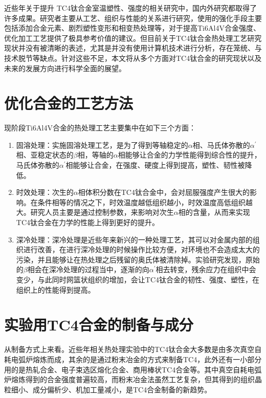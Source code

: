 \documentclass[
class = book,
zihao = -4,
font = noto,
paper = a4paper,
openany
]{easybook}
\newcommand{\ti}{Ti6Al4V}
\begin{document}
近些年关于提升 TC4钛合金室温塑性、强度的相关研究中，国内外研究都取得了许多成果\cite{guokaiTC4taihejinrechuligongyideyanjiuxianzhuangjijinzhan2021}。研究者主要从工艺、组织与性能的关系进行研究，使用的强化手段主要包括添加合金元素、剧烈塑性变形和相变热处理等，对于提高\ti 合金强度、优化加工工艺提供了极具参考价值的建议。但目前关于TC4钛合金热处理工艺研究现状并没有被清晰的表述，尤其是并没有使用计算机技术进行分析，存在笼统、与技术脱节等缺点。针对这些不足，本文将从多个方面对TC4钛合金的研究现状以及未来的发展方向进行科学全面的展望。

\section{优化合金的工艺方法}
现阶段\ti 合金的热处理工艺主要集中在如下三个方面：
\begin{enumerate}
	\item 固溶处理：实施固溶处理工艺，是为了得到等轴稳定的$\alpha $相、马氏体弥散的$ \alpha ^{'} $相、亚稳定状态的$\beta $相，等轴的$\alpha $相能够让合金的力学性能得到综合性的提升，马氏体弥散的$ \alpha ^{'} $相能够让合金，在强度、硬度上得到提高，塑性、韧性被降低\cite{gurong2002}。
	\item 时效处理：次生的$\alpha $相体积分数在TC4钛合金中，会对屈服强度产生很大的影响。在条件相等的情况之下，时效温度越低组织越小，时效温度高低组织越大。研究人员主要是通过控制参数，来影响对次生$\alpha $相的含量，从而来实现TC4钛合金在力学的性能上得到更好的提升。
	\item 深冷处理：深冷处理是近些年来新兴的一种处理工艺，其可以对金属内部的组织进行改善，在进行深冷处理的时候操作比较方便，对环境也不会造成太大的污染，并且能够让在热处理之后残留的奥氏体被清除掉。实验研究发现，原始的$\beta $相会在深冷处理的过程当中，逐渐的向$\alpha^{'} $相去转变，残余应力在组织中会变少，与此同时网篮状组织的增加，会让TC4钛合金的韧性、强度、塑性，在组织上的性能得到提高。
\end{enumerate}

\section{实验用TC4合金的制备与成分}
从制备方式上来看。近些年相关热处理实验中的TC4钛合金大多数是由{多次真空自耗电弧炉熔炼}\cite{renchiqiangGurongshixiaoduiTC4taihejinxianweizuzhihelixuexingnengdeyingxiang2022,ranxingGurongwenduduiTi6Al4VELItaihejinxianweizuzhijixingnengdeyingxiang2021,lilouGurongshixiaoduiTC4hejinzuzhiyujixiexingnengdeyingxiang2014,jingranGurongshixiaoduiTC4hejinzuzhiyuxingnengdeyingxiang2018}而成，其余的是通过粉末冶金\cite{zhanghaoyinGurongShixiaoduiTC4taihejinzuzhihelixuexingnengdeyingxiang2014,xujianGurongshixiaogongyiduiTC4taihejinzuzhijixingnengdeyingxiang2014}的方式来制备TC4，此外还有一小部分用的是热轧合金\cite{LiuWanYingBuTongReChuLiGongYiDuiTi6Al4VTaiHeJinWeiGuanJieGouHeLiXueXingNengYingXiangYingWen2017}、电子束选区熔化合金\cite{leijunleDianzishuxuanquronghuachengxingTC4hejinxianweizuzhiyuxingnengdeyanjiujinzhan2022}、商用棒状TC4合金\cite{LuYuanYuanShiXiaoChuLiDuiTC4TaiHeJinWeiGuanZuZhiHeLiXueXingNengDeYingXiang2019}等。其中真空自耗电弧炉熔炼得到的合金强度普遍较高，而粉末冶金法虽然工艺复杂，但其得到的组织晶粒细小、成分偏析少、机加工量减小，是TC4合金制备的新趋势。
\end{document}
